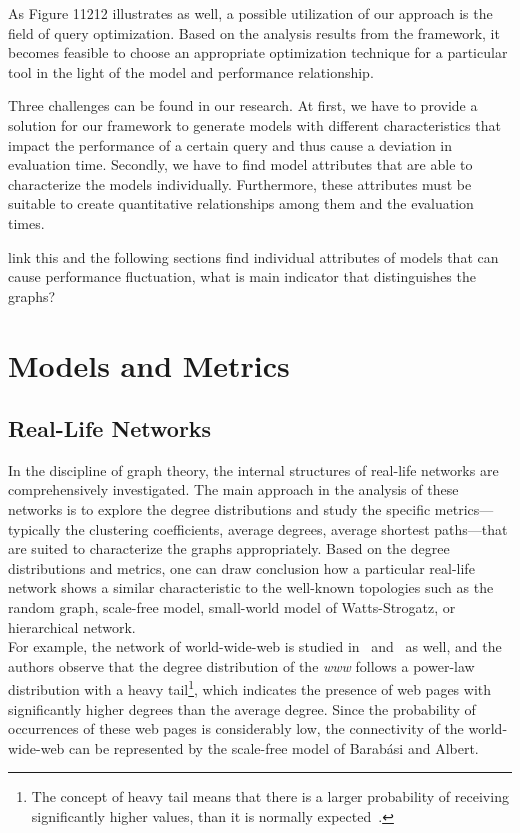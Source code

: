 As Figure 11212 %
illustrates as well, a possible utilization of our approach is the field of query optimization. Based on the analysis results from the framework, it becomes feasible to choose an appropriate optimization technique for a particular tool in the light of the model and performance relationship.

Three challenges can be found in our research. At first, we have to provide a solution for our framework to generate models with different characteristics that impact the performance of a certain query and thus cause a deviation in evaluation time. Secondly, we have to find model attributes that are able to characterize the models individually. Furthermore, these attributes must be suitable to create quantitative relationships among them and the evaluation times.


link this and the following sections
find individual attributes of models that can cause performance fluctuation, what is main indicator that distinguishes the graphs?

\section{Models and Metrics}
\subsection{Real-Life Networks}

In the discipline of graph theory, the internal structures of real-life networks are comprehensively investigated. The main approach in the analysis of these networks is to explore the degree distributions and study the specific metrics---typically the clustering coefficients, average degrees, average shortest paths---that are suited to characterize the graphs appropriately. Based on the degree distributions and metrics, one can draw conclusion how a particular real-life network shows a similar characteristic to the well-known topologies such as the random graph, scale-free model, small-world model of Watts-Strogatz, or hierarchical network.\\
For example, the network of world-wide-web is studied in~\cite{www1} and~\cite{www2} as well, and the authors observe that the degree distribution of the \textit{www} follows a power-law distribution with a heavy tail\footnote{The concept of heavy tail means that there is a larger probability of receiving significantly higher values, than it is normally expected~\cite{heavy_tail}.}, which indicates the presence of web pages with significantly higher degrees than the average degree. Since the probability of occurrences of these web pages is considerably low, the connectivity of the world-wide-web can be represented by the scale-free model of Barabási and Albert.

